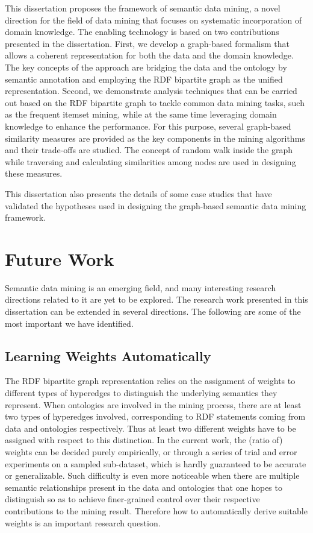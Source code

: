This dissertation proposes the framework of semantic data mining, a novel direction for the field of data mining that focuses on systematic incorporation of domain knowledge. The enabling technology is based on two contributions presented in the dissertation. First, we develop a graph-based formalism that allows a coherent representation for both the data and the domain knowledge. The key concepts of the approach are bridging the data and the ontology by semantic annotation and employing the RDF bipartite graph as the unified representation. Second, we demonstrate analysis techniques that can be carried out based on the RDF bipartite graph to tackle common data mining tasks, such as the frequent itemset mining, while at the same time leveraging domain knowledge to enhance the performance. For this purpose, several graph-based similarity measures are provided as the key components in the mining algorithms and their trade-offs are studied. The concept of random walk inside the graph while traversing and calculating similarities among nodes are used in designing these measures.

This dissertation also presents the details of some case studies that have validated the hypotheses used in designing the graph-based semantic data mining framework.

\section{Future Work}
Semantic data mining is an emerging field, and many interesting research directions related to it are yet to be explored. The research work presented in this dissertation can be extended in several directions. The following are some of the most important we have identified.

\subsection{Learning Weights Automatically}
The RDF bipartite graph representation relies on the assignment of weights to different types of hyperedges to distinguish the underlying semantics they represent. When ontologies are involved in the mining process, there are at least two types of hyperedges involved, corresponding to RDF statements coming from data and ontologies respectively. Thus at least two different weights have to be assigned with respect to this distinction. In the current work, the (ratio of) weights can be decided purely empirically, or through a series of trial and error experiments on a sampled sub-dataset, which is hardly guaranteed to be accurate or generalizable. Such difficulty is even more noticeable when there are multiple semantic relationships present in the data and ontologies that one hopes to distinguish so as to achieve finer-grained control over their respective contributions to the mining result. Therefore how to automatically derive suitable weights is an important research question.

